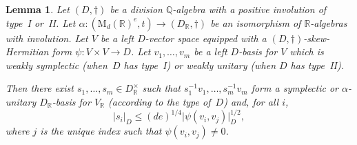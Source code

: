 \documentclass[JEP,XML,SOM,Unicode,NoFloatCountersInSection]{cedram}
\newcommand{\bQ}{\mathbb{Q}}
\newcommand{\bR}{\mathbb{R}}
\newcommand{\rM}{\mathrm{M}}
\newcommand{\abs}[1]{\lvert #1 \rvert}
\newtheorem{lemma}{Lemma}[section]
\begin{document}
\begin{lemma} \label{semi-orthogonal-normalise}
Let $(D,\dag)$ be a division $\bQ$-algebra with a positive involution of type~I or~II.
Let $\alpha \colon (\rM_d(\bR)^e,t) \to (D_\bR,\dag)$ be an isomorphism of $\bR$-algebras with involution.
Let $V$ be a left $D$-vector space equipped with a $(D,\dag)$-skew-Hermitian form \hbox{$\psi \colon V \times V \to D$}.
Let $v_1, \dotsc, v_m$ be a left $D$-basis for $V$ which is weakly symplectic (when~$D$ has type~I) or weakly unitary (when $D$ has type~II).

Then there exist $s_1, \dotsc, s_m \in D_\bR^\times$
such that $s_1^{-1} v_1, \dotsc, s_m^{-1} v_m$ form a symplectic or $\alpha$-unitary $D_\bR$-basis for $V_\bR$ (according to the type of~$D$) and, for all $i$,
\[
\abs{s_i}_D \leq (de)^{1/4} \abs{\psi(v_i, v_j)}_D^{1/2},
\]
where $j$ is the unique index such that $\psi(v_i, v_j) \neq 0$.
\end{lemma}
\end{document}
